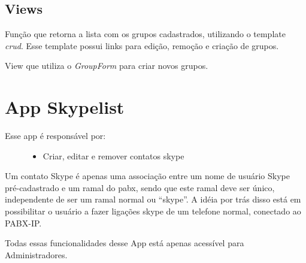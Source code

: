 \documentclass[letterpaper,10pt,brazil]{sphinxmanual}
\begin{document}
\subsection{Views}
\label{apps/groups:module-groups.views}\label{apps/groups:views}

\begin{fulllineitems}
\label{apps/groups:groups.views.index}
Função que retorna a lista com os grupos cadastrados, utilizando o template \emph{crud}. Esse template possui links para edição, remoção e criação de grupos.

\end{fulllineitems}


\begin{fulllineitems}
\label{apps/groups:groups.views.create}
View que utiliza o \emph{GroupForm} para criar novos grupos.

\end{fulllineitems}



\section{App Skypelist}
\label{apps/skypelist:app-skypelist}\label{apps/skypelist::doc}\label{apps/skypelist:skypelist}\begin{description}
\item[{Esse app é responsável por:}] \leavevmode\begin{itemize}
\item {} 
Criar, editar e remover contatos skype

\end{itemize}

\end{description}

Um contato Skype é apenas uma associação entre um nome de usuário Skype pré-cadastrado e um ramal do pabx, sendo que este ramal deve ser único, independente de ser um ramal normal ou ``skype''. A idéia por trás disso está em possibilitar o usuário a fazer ligações skype de um telefone normal, conectado ao PABX-IP.

Todas essas funcionalidades desse App está apenas acessível para Administradores.
\end{document}
